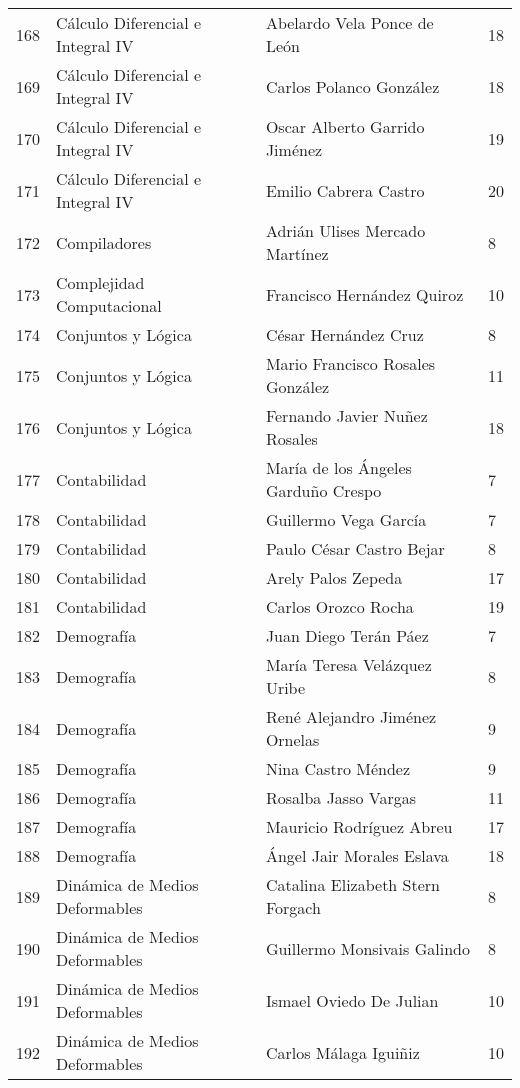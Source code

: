 \begin{table}[ht]
\begin{tabular}{rlll}
  168 & Cálculo Diferencial e Integral IV & Abelardo Vela Ponce de León & 18 \\ 
  169 & Cálculo Diferencial e Integral IV & Carlos Polanco González & 18 \\ 
  170 & Cálculo Diferencial e Integral IV & Oscar Alberto Garrido Jiménez & 19 \\ 
  171 & Cálculo Diferencial e Integral IV & Emilio Cabrera Castro & 20 \\ 
  172 & Compiladores & Adrián Ulises Mercado Martínez & 8 \\ 
  173 & Complejidad Computacional & Francisco Hernández Quiroz & 10 \\ 
  174 & Conjuntos y Lógica & César Hernández Cruz & 8 \\ 
  175 & Conjuntos y Lógica & Mario Francisco Rosales González & 11 \\ 
  176 & Conjuntos y Lógica & Fernando Javier Nuñez Rosales & 18 \\ 
  177 & Contabilidad & María de los Ángeles Garduño Crespo & 7 \\ 
  178 & Contabilidad & Guillermo Vega García & 7 \\ 
  179 & Contabilidad & Paulo César Castro Bejar & 8 \\ 
  180 & Contabilidad & Arely Palos Zepeda & 17 \\ 
  181 & Contabilidad & Carlos Orozco Rocha & 19 \\ 
  182 & Demografía & Juan Diego Terán Páez & 7 \\ 
  183 & Demografía & María Teresa Velázquez Uribe & 8 \\ 
  184 & Demografía & René Alejandro Jiménez Ornelas & 9 \\ 
  185 & Demografía & Nina Castro Méndez & 9 \\ 
  186 & Demografía & Rosalba Jasso Vargas & 11 \\ 
  187 & Demografía & Mauricio Rodríguez Abreu & 17 \\ 
  188 & Demografía & Ángel Jair Morales Eslava & 18 \\ 
  189 & Dinámica de Medios Deformables & Catalina Elizabeth Stern Forgach & 8 \\ 
  190 & Dinámica de Medios Deformables & Guillermo Monsivais Galindo & 8 \\ 
  191 & Dinámica de Medios Deformables & Ismael Oviedo De Julian & 10 \\ 
  192 & Dinámica de Medios Deformables & Carlos Málaga Iguiñiz & 10 \\ 

\end{tabular}
\end{table}
